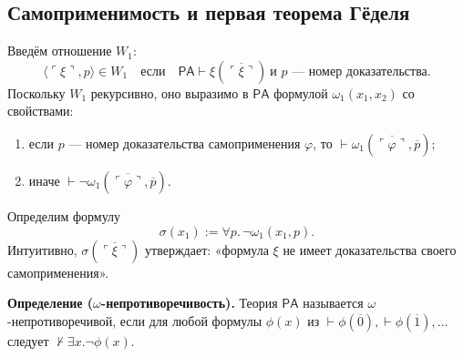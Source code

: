 \documentclass[10pt]{article}
\begin{document}
\subsection{Самоприменимость и первая теорема Гёделя}
Введём отношение $W_1$:
\[
\langle\ulcorner\xi\urcorner,p\rangle \in W_1 \quad\text{если}\quad \mathsf{PA}\vdash \xi(\overline{\ulcorner\xi\urcorner})\ \text{и $p$ — номер доказательства}.
\]
Поскольку $W_1$ рекурсивно, оно выразимо в $\mathsf{PA}$ формулой $\omega_1(x_1,x_2)$ со свойствами:
\begin{enumerate}
  \item если $p$ — номер доказательства самоприменения $\varphi$, то $\vdash \omega_1(\overline{\ulcorner\varphi\urcorner},\overline{p})$;
  \item иначе $\vdash \neg\omega_1(\overline{\ulcorner\varphi\urcorner},\overline{p})$.
\end{enumerate}

Определим формулу
\[
\sigma(x_1) := \forall p.\,\neg\omega_1(x_1,p).
\]
Интуитивно, $\sigma(\overline{\ulcorner\xi\urcorner})$ утверждает: «формула $\xi$ не имеет доказательства своего самоприменения».

\textbf{Определение ($\omega$-непротиворечивость).} Теория $\mathsf{PA}$ называется $\omega$-непротиворечивой, если для любой формулы $\phi(x)$ из $\vdash\phi(\overline{0}), \vdash\phi(\overline{1}), \dots$ следует $\not\vdash\exists x.\neg\phi(x)$.
\end{document}
